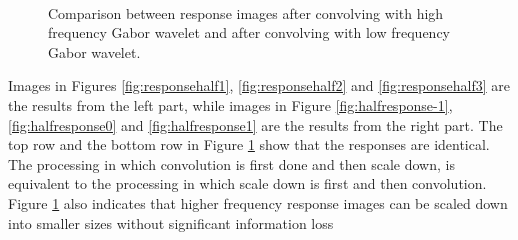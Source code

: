 \begin{figure}[ht]
\begin{center}
   \\
 \caption{Comparison between response images after convolving with high frequency Gabor wavelet and after convolving with low frequency Gabor wavelet.}
\label{fig:conv2scaledown}
\end{center}
\end{figure}
Images in \mbox{Figures} \ref{fig:responsehalf1}, \ref{fig:responsehalf2} and \ref{fig:responsehalf3} are the results from the left part, while images in \mbox{Figure} \ref{fig:halfresponse-1}, \ref{fig:halfresponse0} and \ref{fig:halfresponse1} are the results from the right part. The top row and the bottom row in \mbox{Figure} \ref{fig:conv2scaledown} show that the responses are identical. The processing in which convolution is first done and then scale down, is equivalent to the processing in which scale down is first and then convolution. \mbox{Figure} \ref{fig:conv2scaledown} also indicates that higher frequency response images can be scaled down into smaller sizes without significant information loss 

